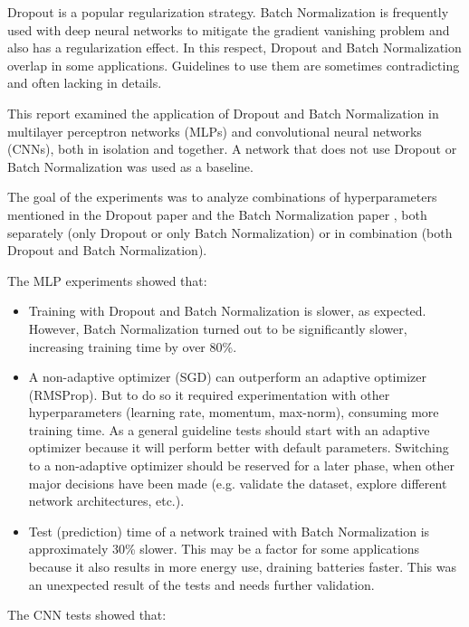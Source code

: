 \documentclass[../CAP6619_term_project_cgarbin.tex]{subfiles}
\begin{document}
Dropout is a popular regularization strategy. Batch Normalization is frequently used with deep neural networks to mitigate the gradient vanishing problem and also has a regularization effect. In this respect, Dropout and Batch Normalization overlap in some applications. Guidelines to use them are sometimes contradicting and often lacking in details.

This report examined the application of Dropout and Batch Normalization in multilayer perceptron networks (MLPs) and convolutional neural networks (CNNs), both in isolation and together. A network that does not use Dropout or Batch Normalization was used as a baseline.

The goal of the experiments was to analyze combinations of hyperparameters mentioned in the Dropout paper \cite{Srivastava2014} and the Batch Normalization paper \cite{Ioffe2015}, both separately (only Dropout or only Batch Normalization) or in combination (both Dropout and Batch Normalization).

The MLP experiments showed that:

\begin{itemize}
\item Training with Dropout and Batch Normalization is slower, as expected. However, Batch Normalization turned out to be significantly slower, increasing training time by over 80\%.
\item A non-adaptive optimizer (SGD) can outperform an adaptive optimizer (RMSProp). But to do so it required experimentation with other hyperparameters (learning rate, momentum, max-norm), consuming more training time. As a general guideline tests should start with an adaptive optimizer because it will perform better with default parameters. Switching to a non-adaptive optimizer should be reserved for a later phase, when other major decisions have been made (e.g. validate the dataset, explore different network architectures, etc.).
\item Test (prediction) time of a network trained with Batch Normalization is approximately 30\% slower. This may be a factor for some applications because it also results in more energy use, draining batteries faster. This was an unexpected result of the tests and needs further validation.
\end{itemize}

The CNN tests showed that:
\end{document}
